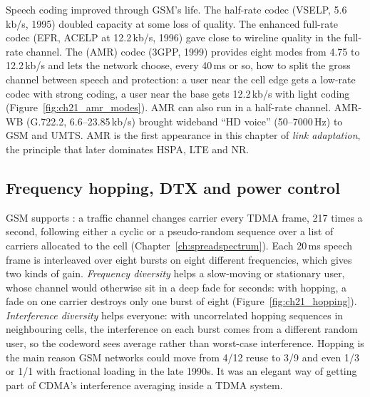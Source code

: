 Speech coding improved through GSM's life. The half-rate codec (VSELP, 5.6\,kb/s, 1995) doubled
capacity at some loss of quality. The enhanced full-rate codec (EFR, ACELP at 12.2\,kb/s, 1996) gave
close to wireline quality in the full-rate channel. The  (AMR) codec
(3GPP, 1999) provides eight modes from 4.75 to 12.2\,kb/s and lets the network choose, every 40\,ms
or so, how to split the gross channel between speech and protection: a user near the cell edge gets
a low-rate codec with strong coding, a user near the base gets 12.2\,kb/s with light coding
(Figure~\ref{fig:ch21_amr_modes}). AMR can also run in a half-rate channel. AMR-WB (G.722.2,
6.6--23.85\,kb/s) brought wideband ``HD voice'' (50--7000\,Hz) to GSM and UMTS. AMR is the first
appearance in this chapter of \emph{link adaptation}, the principle that later dominates HSPA, LTE
and NR.

\subsection{Frequency hopping, DTX and power control}

GSM supports : a traffic channel changes carrier every TDMA frame, 217
times a second, following either a cyclic or a pseudo-random sequence over a list of carriers
allocated to the cell (Chapter~\ref{ch:spreadspectrum}). Each 20\,ms speech frame is interleaved
over eight bursts on eight different frequencies, which gives two kinds of gain.
\emph{Frequency diversity} helps a slow-moving or stationary user, whose channel would otherwise sit
in a deep fade for seconds: with hopping, a fade on one carrier destroys only one burst of eight
(Figure~\ref{fig:ch21_hopping}). \emph{Interference diversity} helps everyone: with uncorrelated
hopping sequences in neighbouring cells, the interference on each burst comes from a different
random user, so the codeword sees average rather than worst-case interference. Hopping is the main
reason GSM networks could move from 4/12 reuse to 3/9 and even 1/3 or 1/1 with fractional loading in
the late 1990s. It was an elegant way of getting part of CDMA's interference averaging inside a TDMA
system.



